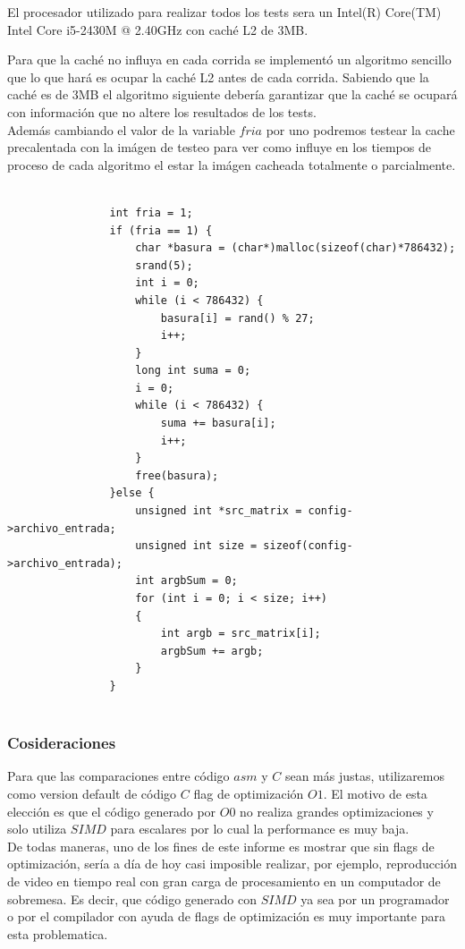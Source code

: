 El procesador utilizado para realizar todos los tests sera un Intel(R) Core(TM) Intel Core i5-2430M @ 2.40GHz con caché L2 de 3MB.

Para que la caché no influya en cada corrida se implementó un algoritmo sencillo que lo que hará es ocupar la caché L2 antes de cada corrida. Sabiendo que la caché es de 3MB el algoritmo siguiente debería garantizar que la caché se ocupará con información que no altere los resultados de los tests. \\
Además cambiando el valor de la variable $fria$ por uno podremos testear la cache precalentada con la imágen de testeo para ver como influye en los tiempos de proceso de cada algoritmo el estar la imágen cacheada totalmente o parcialmente.

\begin{codesnippet}
\begin{verbatim}
                
  				int fria = 1;
				if (fria == 1) {
					char *basura = (char*)malloc(sizeof(char)*786432);
					srand(5);
					int i = 0;
					while (i < 786432) {
						basura[i] = rand() % 27;            
						i++;                
					}
					long int suma = 0;
					i = 0;                
					while (i < 786432) {
						suma += basura[i];   
						i++;         
					}
					free(basura);
				}else {
					unsigned int *src_matrix = config->archivo_entrada;
					unsigned int size = sizeof(config->archivo_entrada);
					int argbSum = 0;
					for (int i = 0; i < size; i++)
					{
						int argb = src_matrix[i];
						argbSum += argb;
					}
				}
                
\end{verbatim}
\end{codesnippet}

\pagebreak

\subsubsection{Cosideraciones}

Para que las comparaciones entre código $asm$ y $C$ sean más justas, utilizaremos como version default de código $C$ flag de optimización $O1$. El motivo de esta elección es que el código generado por $O0$ no realiza grandes optimizaciones y solo utiliza $SIMD$ para escalares por lo cual la performance es muy baja. \\

De todas maneras, uno de los fines de este informe es mostrar que sin flags de optimización, sería a día de hoy casi imposible realizar, por ejemplo, reproducción de video en tiempo real con gran carga de procesamiento en un computador de sobremesa. Es decir, que código generado con $SIMD$ ya sea por un programador o por el compilador con ayuda de flags de optimización es muy importante para esta problematica.\\

